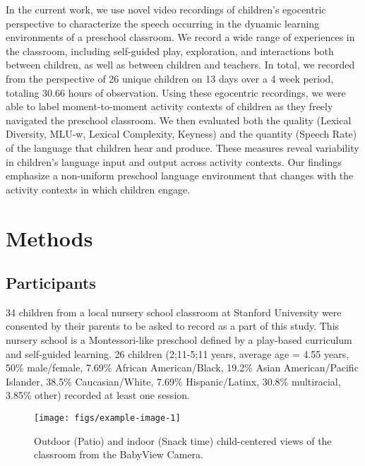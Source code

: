 \documentclass[10pt, letterpaper]{article}
\newenvironment{CodeChunk}{}{}
\begin{document}
In the current work, we use novel video recordings of children's
egocentric perspective to characterize the speech occurring in the
dynamic learning environments of a preschool classroom. We record a wide
range of experiences in the classroom, including self-guided play,
exploration, and interactions both between children, as well as between
children and teachers. In total, we recorded from the perspective of 26
unique children on 13 days over a 4 week period, totaling 30.66 hours of
observation. Using these egocentric recordings, we were able to label
moment-to-moment activity contexts of children as they freely navigated
the preschool classroom. We then evaluated both the quality (Lexical
Diversity, MLU-w, Lexical Complexity, Keyness) and the quantity (Speech
Rate) of the language that children hear and produce. These measures
reveal variability in children's language input and output across
activity contexts. Our findings emphasize a non-uniform preschool
language environment that changes with the activity contexts in which
children engage.

\hypertarget{methods}{%
\section{Methods}\label{methods}}

\hypertarget{participants}{%
\subsection{Participants}\label{participants}}

34 children from a local nursery school classroom at Stanford University
were consented by their parents to be asked to record as a part of this
study. This nursery school is a Montessori-like preschool defined by a
play-based curriculum and self-guided learning. 26 children (2;11-5;11
years, average age = 4.55 years, 50\% male/female, 7.69\% African
American/Black, 19.2\% Asian American/Pacific Islander, 38.5\%
Caucasian/White, 7.69\% Hispanic/Latinx, 30.8\% multiracial, 3.85\%
other) recorded at least one session.

\begin{CodeChunk}
\begin{figure}[ht!]

{\centering \texttt{[image: figs/example-image-1]} 

}

\caption[Outdoor (Patio) and indoor (Snack time) child-centered views of the classroom from the BabyView Camera]{Outdoor (Patio) and indoor (Snack time) child-centered views of the classroom from the BabyView Camera.}\label{fig:example-image}
\end{figure}
\end{CodeChunk}
\end{document}
